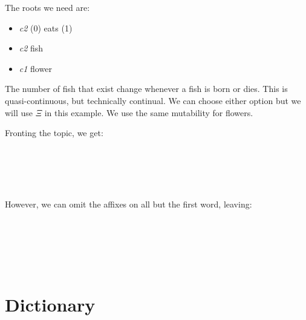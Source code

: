 \documentclass{book}
\begin{document}
The roots we need are:

\begin{itemize}
  \item {} \emph{c2} (0) eats (1)
  \item {} \emph{c2} fish
  \item {} \emph{c1} flower
\end{itemize}

The number of fish that exist change whenever a fish is born or dies. This is quasi-continuous, but technically continual. We can choose either option but we will use $\Xi$ in this example. We use the same mutability for flowers.

Fronting the topic, we get: \\
~\\
 \\
 \\
   \\
   \\

However, we can omit the affixes on all but the first word, leaving: \\
~\\
 \\
 \\
   \\
   \\

\appendix

\chapter{Dictionary}

\begin{multicols}{2}
    
\end{multicols}
\end{document}
